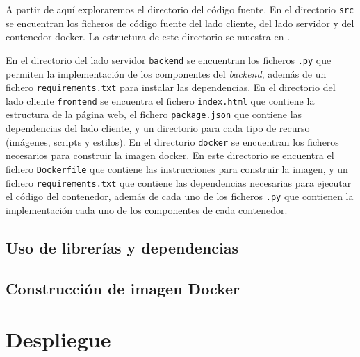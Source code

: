 A partir de aquí exploraremos el directorio del código fuente. En el directorio \texttt{src} se encuentran los ficheros de código fuente del lado cliente, del lado servidor y del contenedor docker. La estructura de este directorio se muestra en .

\begin{figure}[htb]
    {
    \begin{tcolorbox}
    \end{tcolorbox}
    }
\end{figure}

En el directorio del lado servidor \texttt{backend} se encuentran los ficheros \texttt{.py} que permiten la implementación de los componentes del \textit{backend}, además de un fichero \texttt{requirements.txt} para instalar las dependencias.
En el directorio del lado cliente \texttt{frontend} se encuentra el fichero \texttt{index.html} que contiene la estructura de la página web, el fichero \texttt{package.json} que contiene las dependencias del lado cliente, y un directorio para cada tipo de recurso (imágenes, scripts y estilos). 
En el directorio \texttt{docker} se encuentran los ficheros necesarios para construir la imagen docker. En este directorio se encuentra el fichero \texttt{Dockerfile} que contiene las instrucciones para construir la imagen, y un fichero \texttt{requirements.txt} que contiene las dependencias necesarias para ejecutar el código del contenedor, además de cada uno de los ficheros \texttt{.py} que contienen la implementación cada uno de los componentes de cada contenedor. 

\subsection{Uso de librerías y dependencias} \label{subsec:uso_librerias_dependencias}



\subsection{Construcción de imagen Docker} \label{subsec:construccion_imagen_docker}

\section{Despliegue} \label{sec:despliegue}

